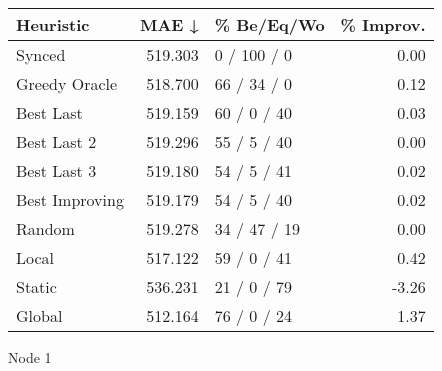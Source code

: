 \begin{tabular}{lrlr}
\toprule
\textbf{Heuristic} & \textbf{MAE ↓} & \textbf{\% Be/Eq/Wo} & \textbf{\% Improv.} \\
\midrule
            Synced &        519.303 &          0 / 100 / 0 &                0.00 \\
     Greedy Oracle &        518.700 &          66 / 34 / 0 &                0.12 \\
         Best Last &        519.159 &          60 / 0 / 40 &                0.03 \\
       Best Last 2 &        519.296 &          55 / 5 / 40 &                0.00 \\
       Best Last 3 &        519.180 &          54 / 5 / 41 &                0.02 \\
    Best Improving &        519.179 &          54 / 5 / 40 &                0.02 \\
            Random &        519.278 &         34 / 47 / 19 &                0.00 \\
             Local &        517.122 &          59 / 0 / 41 &                0.42 \\
            Static &        536.231 &          21 / 0 / 79 &               -3.26 \\
            Global &        512.164 &          76 / 0 / 24 &                1.37 \\
\bottomrule
\end{tabular}
\caption{Node 1}
\label{tab:iid_lr01_le1_bs4_1}
